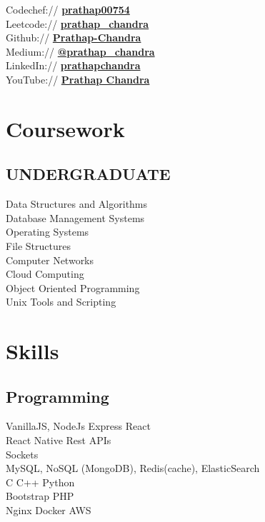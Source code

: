 \documentclass[]{deedy-resume-openfont}
\begin{document}
\begin{minipage}[t]{0.33\textwidth}
Codechef://  \href{https://www.codechef.com/users/prathap00754}{\bf prathap00754} \\
Leetcode://  \href{https://leetcode.com/prathap_chandra/}{\bf prathap\_chandra} \\
Github:// \href{https://github.com/Prathap-Chandra}{\bf Prathap-Chandra} \\
Medium:// \href{https://medium.com/@prathap_chandra/}{\bf @prathap\_chandra} \\
LinkedIn://  \href{https://www.linkedin.com/in/prathapchandra}{\bf prathapchandra} \\
YouTube://  \href{https://www.youtube.com/channel/UChfA9tIKEAduV_kxuHyAIkA}{\bf Prathap Chandra} \\

\sectionsep
\section{Coursework}
\subsection{UNDERGRADUATE}
Data Structures and Algorithms\\
Database Management Systems\\
Operating Systems\\
File Structures\\
Computer Networks\\
Cloud Computing\\
Object Oriented Programming\\
Unix Tools and Scripting\\
\sectionsep


\section{Skills}
\subsection{Programming}
VanillaJS, NodeJs \textbullet{} Express \textbullet{} 
React \\ \textbullet{} React Native \textbullet{} Rest APIs\\
\textbullet{} Sockets\\ 
\textbullet{} MySQL, NoSQL (MongoDB),
Redis(cache), ElasticSearch\\ 
\textbullet{} C \textbullet{} C++ \textbullet{} Python\\
\textbullet{} Bootstrap \textbullet{} PHP\\
\textbullet{} Nginx \textbullet{} Docker \textbullet{} AWS\\
\sectionsep

%
%

\end{minipage} 
\end{document}
